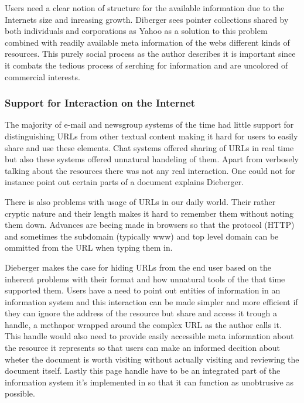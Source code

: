 \documentclass[12pt,a4paper]{article}
\begin{document}
Users need a clear notion of structure for the available information due to
the Internets size and inreasing growth. Diberger sees pointer collections
shared by both individuals and corporations as Yahoo as a solution to this
problem combined with readily available meta information of the webs
different kinds of resources. This purely social process as the author
describes it is important since it combats the tedious process of serching for
information and are uncolored of commercial interests.

\subsubsection{Support for Interaction on the Internet}

The majority of e-mail and newsgroup systems of the time had little support
for distinguishing URLs from other textual content making it hard for users to
easily share and use these elements. Chat systems offered sharing of URLs in
real time but also these systems offered unnatural handeling of them.
Apart from verbosely talking about the resources there was not any real
interaction. One could not for instance point out certain parts of a document
explains Dieberger.

There is also problems with usage of URLs in our daily world. Their rather
cryptic nature and their length makes it hard to remember them without noting
them down. Advances are beeing made in browsers so that the protocol (HTTP)
and sometimes the subdomain (typically www) and top level domain can be
ommitted from the URL when typing them in.

Dieberger makes the case for hiding URLs from the end user based on the
inherent problems with their format and how unnatural tools of the that time
supported them. Users have a need to point out entities of information in an
information system and this interaction can be made simpler and more efficient
if they can ignore the address of the resource but share and access it trough
a handle, a methapor wrapped around the complex URL as the author calls it.
This handle would also need to provide easily accessible meta information
about the resource it represents so that users can make an informed decition
about wheter the document is worth visiting without actually visiting and
reviewing the document itself. Lastly this page handle have to be an
integrated part of the information system it's implemented in so that it
can function as unobtrusive as possible.
\end{document}
